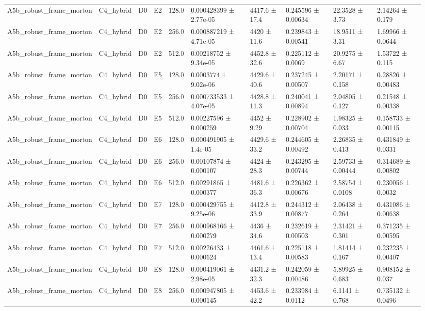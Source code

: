 \begin{table}
\begin{tabular}{llllllllll}
A5b\_robust\_frame\_morton & C4\_hybrid & D0 & E2 & 128.0 & 0.000428399 ± 2.77e-05 & 4417.6 ± 17.4 & 0.245596 ± 0.00634 & 22.3528 ± 3.73 & 2.14264 ± 0.179 \\
A5b\_robust\_frame\_morton & C4\_hybrid & D0 & E2 & 256.0 & 0.000887219 ± 4.71e-05 & 4420 ± 11.6 & 0.239843 ± 0.00541 & 18.9511 ± 3.31 & 1.69966 ± 0.0644 \\
A5b\_robust\_frame\_morton & C4\_hybrid & D0 & E2 & 512.0 & 0.00218752 ± 9.34e-05 & 4452.8 ± 32.6 & 0.225112 ± 0.0069 & 20.9275 ± 6.67 & 1.53722 ± 0.115 \\
A5b\_robust\_frame\_morton & C4\_hybrid & D0 & E5 & 128.0 & 0.0003774 ± 9.02e-06 & 4429.6 ± 40.6 & 0.237245 ± 0.00507 & 2.20171 ± 0.158 & 0.28826 ± 0.00483 \\
A5b\_robust\_frame\_morton & C4\_hybrid & D0 & E5 & 256.0 & 0.000733533 ± 4.07e-05 & 4428.8 ± 11.3 & 0.240041 ± 0.00894 & 2.04805 ± 0.127 & 0.21548 ± 0.00338 \\
A5b\_robust\_frame\_morton & C4\_hybrid & D0 & E5 & 512.0 & 0.00227596 ± 0.000259 & 4452 ± 9.29 & 0.228902 ± 0.00704 & 1.98325 ± 0.033 & 0.158733 ± 0.00115 \\
A5b\_robust\_frame\_morton & C4\_hybrid & D0 & E6 & 128.0 & 0.000491905 ± 1.4e-05 & 4429.6 ± 33.2 & 0.244605 ± 0.00492 & 2.26835 ± 0.413 & 0.431849 ± 0.0331 \\
A5b\_robust\_frame\_morton & C4\_hybrid & D0 & E6 & 256.0 & 0.00107874 ± 0.000107 & 4424 ± 28.3 & 0.243295 ± 0.00744 & 2.59733 ± 0.00444 & 0.314689 ± 0.00802 \\
A5b\_robust\_frame\_morton & C4\_hybrid & D0 & E6 & 512.0 & 0.00291865 ± 0.000377 & 4481.6 ± 36.3 & 0.226362 ± 0.00676 & 2.58754 ± 0.0108 & 0.230056 ± 0.0032 \\
A5b\_robust\_frame\_morton & C4\_hybrid & D0 & E7 & 128.0 & 0.000429755 ± 9.25e-06 & 4412.8 ± 33.9 & 0.244312 ± 0.00877 & 2.06438 ± 0.264 & 0.431086 ± 0.00638 \\
A5b\_robust\_frame\_morton & C4\_hybrid & D0 & E7 & 256.0 & 0.000968166 ± 0.000279 & 4436 ± 34.6 & 0.232619 ± 0.00503 & 2.31421 ± 0.301 & 0.371235 ± 0.00595 \\
A5b\_robust\_frame\_morton & C4\_hybrid & D0 & E7 & 512.0 & 0.00226433 ± 0.000624 & 4461.6 ± 13.4 & 0.225118 ± 0.00583 & 1.81414 ± 0.167 & 0.232235 ± 0.00407 \\
A5b\_robust\_frame\_morton & C4\_hybrid & D0 & E8 & 128.0 & 0.000419061 ± 2.98e-05 & 4431.2 ± 32.3 & 0.242059 ± 0.00486 & 5.89925 ± 0.683 & 0.908152 ± 0.037 \\
A5b\_robust\_frame\_morton & C4\_hybrid & D0 & E8 & 256.0 & 0.000947805 ± 0.000145 & 4453.6 ± 42.2 & 0.233984 ± 0.0112 & 6.1141 ± 0.768 & 0.735132 ± 0.0496 \\

\end{tabular}
\end{table}
